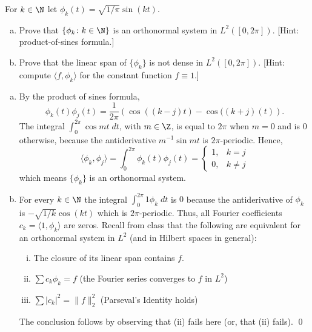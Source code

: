 \begin{hwsol}
For $k \in \N$ let $\phi_k(t)= \sqrt{1/\pi} \sin(k t)$. 
	\begin{enumerate}[(a)]
	\item Prove that $\{ \phi_k \colon k \in \N \}$ is an orthonormal system in $L^2([0, 2\pi])$.  [Hint: product-of-sines formula.]
	\item Prove that the linear span of $\{ \phi_k \}$ is not dense in $L^2([0, 2\pi])$. [Hint: compute $\langle f, \phi_k \rangle$ for the constant function $f \equiv 1$.] \\
	\end{enumerate}

\pf \hfill
\begin{enumerate}[(a)]
\item By the product of sines formula, 
        \[
        \phi_k(t)\phi_j(t)= \frac{1}{2\pi} \left( \cos((k-j)t) - \cos((k+j)(t) \right).
        \]
The integral  $\int_0^{2\pi} \cos mt \;dt$, with $m \in \Z$, is equal to $2\pi$ when $m= 0$ and is $0$ otherwise, because the antiderivative $m^{-1} \sin mt$ is $2\pi$-periodic. Hence, 
        \[
        \langle \phi_k, \phi_j \rangle= \int_0^{2\pi}\phi_k(t)\phi_j(t)=
        \begin{cases}
        1, & k=j \\ 
        0, & k \neq j
        \end{cases}
        \]
which means $\{ \phi_k \}$ is an orthonormal system.

\item For every $k \in \N$ the integral $\int_0^{2\pi}1 \phi_k \;dt$ is $0$ because the antiderivative of $\phi_k$ is $-\sqrt{1/k} \cos(kt)$ which is $2\pi$-periodic. Thus, all Fourier coefficients $c_k= \langle 1, \phi_k \rangle$ are zeros. Recall from class that the following are equivalent for an orthonormal system in $L^2$ (and in Hilbert spaces in general): 
        \begin{enumerate}[(i)]
        \item The closure of its linear span contains $f$.
        \item $\sum c_k \phi_k= f$ (the Fourier series converges to $f$ in $L^2$)
        \item $\sum |c_k|^2= \|f\|_2^2$ (Parseval's Identity holds)
        \end{enumerate}
The conclusion follows by observing that (ii) fails here (or, that (ii) fails). \qed \\
\end{enumerate}
\end{hwsol}
 

